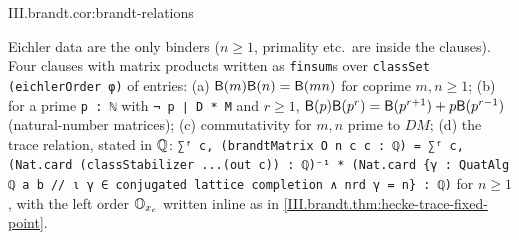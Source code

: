 \begin{tfformal}{III.brandt.cor:brandt-relations}
\begin{tffidelity}
Eichler data are the only binders ($n\ge1$, primality etc.\ are inside the clauses). Four clauses with matrix products written as \texttt{finsum}s over \texttt{classSet (eichlerOrder φ)} of entries: (a) $\mathsf{B}(m)\mathsf{B}(n)=\mathsf{B}(mn)$ for coprime $m,n\ge1$; (b) for a prime \texttt{p : ℕ} with \texttt{¬ p ∣ D * M} and $r\ge1$, $\mathsf{B}(p)\mathsf{B}(p^r)=\mathsf{B}(p^{r+1})+p\mathsf{B}(p^{r-1})$ (natural-number matrices); (c) commutativity for $m,n$ prime to $DM$; (d) the trace relation, stated in $\mathbb{Q}$: \texttt{∑ᶠ c, (brandtMatrix O n c c : ℚ) = ∑ᶠ c, (Nat.card (classStabilizer ...(out c)) : ℚ)⁻¹ * (Nat.card \{γ : QuatAlg ℚ a b // ι γ ∈ conjugated lattice completion ∧ nrd γ = n\} : ℚ)} for $n\ge1$, with the left order $\mathbb{O}_{x_c}$ written inline as in \cref{III.brandt.thm:hecke-trace-fixed-point}.
\end{tffidelity}
\end{tfformal}
